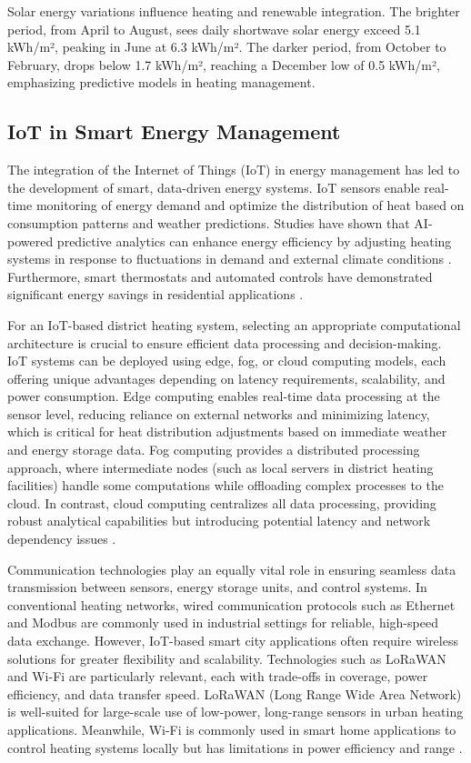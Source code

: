 \documentclass[conference]{IEEEtran}
\begin{document}
Solar energy variations influence heating and renewable integration. The brighter period, from April to August, sees daily shortwave solar energy exceed 5.1 kWh/m², peaking in June at 6.3 kWh/m². The darker period, from October to February, drops below 1.7 kWh/m², reaching a December low of 0.5 kWh/m², emphasizing predictive models in heating management. \cite{weatherspark_assen}


\subsection{IoT in Smart Energy Management}
The integration of the Internet of Things (IoT) in energy management has led to the development of smart, data-driven energy systems. IoT sensors enable real-time monitoring of energy demand and optimize the distribution of heat based on consumption patterns and weather predictions\cite{smarthome_iot_big_data}. Studies have shown that AI-powered predictive analytics can enhance energy efficiency by adjusting heating systems in response to fluctuations in demand and external climate conditions \cite{ai_energy}. Furthermore, smart thermostats and automated controls have demonstrated significant energy savings in residential applications \cite{smart_heating}.

For an IoT-based district heating system, selecting an appropriate computational architecture is crucial to ensure efficient data processing and decision-making. IoT systems can be deployed using edge, fog, or cloud computing models\cite{s21175922}, each offering unique advantages depending on latency requirements, scalability, and power consumption. Edge computing enables real-time data processing at the sensor level, reducing reliance on external networks and minimizing latency, which is critical for heat distribution adjustments based on immediate weather and energy storage data. Fog computing provides a distributed processing approach, where intermediate nodes (such as local servers in district heating facilities) handle some computations while offloading complex processes to the cloud. In contrast, cloud computing centralizes all data processing, providing robust analytical capabilities but introducing potential latency and network dependency issues \cite{iot_architecture}. 

Communication technologies play an equally vital role in ensuring seamless data transmission between sensors, energy storage units, and control systems. In conventional heating networks, wired communication protocols such as Ethernet and Modbus are commonly used in industrial settings for reliable, high-speed data exchange. However, IoT-based smart city applications often require wireless solutions for greater flexibility and scalability. Technologies such as LoRaWAN and Wi-Fi are particularly relevant, each with trade-offs in coverage, power efficiency, and data transfer speed. LoRaWAN (Long Range Wide Area Network) is well-suited for large-scale use of low-power, long-range sensors in urban heating applications. Meanwhile, Wi-Fi is commonly used in smart home applications to control heating systems locally but has limitations in power efficiency and range \cite{comm_tech_review}. 
\end{document}
